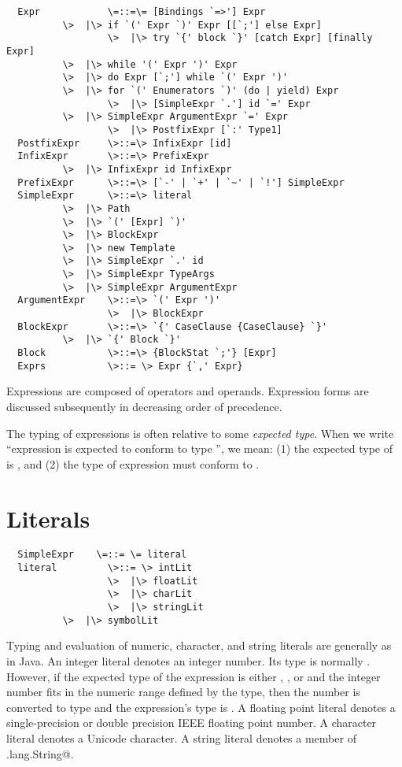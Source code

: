 \documentclass[11pt]{report}
\begin{document}
\syntax\begin{verbatim}
  Expr            \=::=\= [Bindings `=>'] Expr
		  \>  |\> if `(' Expr `)' Expr [[`;'] else Expr]
                  \>  |\> try `{' block `}' [catch Expr] [finally Expr]
		  \>  |\> while '(' Expr ')' Expr
		  \>  |\> do Expr [`;'] while `(' Expr ')'
		  \>  |\> for `(' Enumerators `)' (do | yield) Expr
                  \>  |\> [SimpleExpr `.'] id `=' Expr
		  \>  |\> SimpleExpr ArgumentExpr `=' Expr
                  \>  |\> PostfixExpr [`:' Type1]
  PostfixExpr     \>::=\> InfixExpr [id]
  InfixExpr       \>::=\> PrefixExpr
		  \>  |\> InfixExpr id InfixExpr
  PrefixExpr      \>::=\> [`-' | `+' | `~' | `!'] SimpleExpr 
  SimpleExpr      \>::=\> literal
		  \>  |\> Path
		  \>  |\> `(' [Expr] `)'
		  \>  |\> BlockExpr
		  \>  |\> new Template 
		  \>  |\> SimpleExpr `.' id 
		  \>  |\> SimpleExpr TypeArgs
		  \>  |\> SimpleExpr ArgumentExpr
  ArgumentExpr    \>::=\> `(' Expr ')'
                  \>  |\> BlockExpr
  BlockExpr       \>::=\> `{' CaseClause {CaseClause} `}'
		  \>  |\> `{' Block `}'
  Block           \>::=\> {BlockStat `;'} [Expr]
  Exprs           \>::= \> Expr {`,' Expr}
\end{verbatim}

Expressions are composed of operators and operands. Expression forms are
discussed subsequently in decreasing order of precedence. 

The typing of expressions is often relative to some {\em expected
type}.  When we write ``expression \verb@e@ is expected to conform to
type \verb@T@'', we mean: (1) the expected type of \verb@e@ is
\verb@T@, and (2) the type of expression \verb@e@ must conform to
\verb@T@.

\section{Literals}

\syntax\begin{verbatim}
  SimpleExpr    \=::= \= literal
  literal         \>::= \> intLit
                  \>  |\> floatLit
                  \>  |\> charLit
                  \>  |\> stringLit
		  \>  |\> symbolLit
\end{verbatim}

Typing and evaluation of numeric, character, and string literals are
generally as in Java.  An integer literal denotes an integer
number. Its type is normally \verb@int@. However, if the expected type
\verb@pt@ of the expression is either \verb@byte@, \verb@short@, or
\verb@char@ and the integer number fits in the numeric range defined
by the type, then the number is converted to type \verb@pt@ and the
expression's type is \verb@pt@.  A floating point literal denotes a
single-precision or double precision IEEE floating point number. A
character literal denotes a Unicode character. A string literal
denotes a member of \verb@java.lang.String@.
\end{document}
